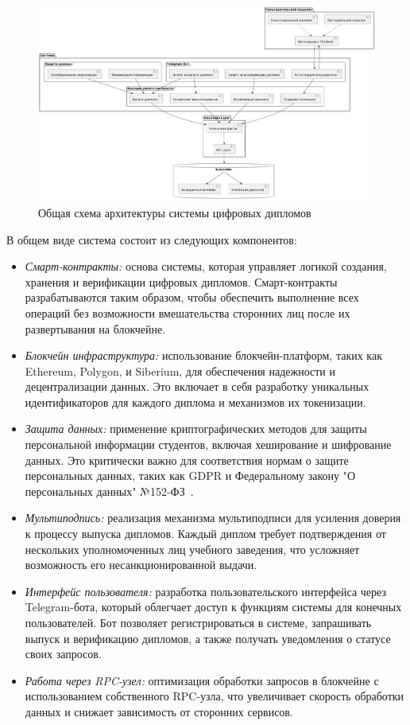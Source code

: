 \begin{figure}[H]
	\centering
	\includegraphics[width=.9\textwidth]{images/sys_arch.png}
	\parskip=6pt
	\caption{Общая схема архитектуры системы цифровых дипломов}
	\label{fig:sys_arch}
\end{figure}

В общем виде система состоит из следующих компонентов:

\begin{itemize}
    \item \textit{Смарт-контракты:} основа системы, которая управляет логикой создания, хранения и верификации цифровых дипломов. Смарт-контракты разрабатываются таким образом, чтобы обеспечить выполнение всех операций без возможности вмешательства сторонних лиц после их развертывания на блокчейне.
    \item \textit{Блокчейн инфраструктура:} использование блокчейн-платформ, таких как Ethereum, Polygon, и Siberium, для обеспечения надежности и децентрализации данных. Это включает в себя разработку уникальных идентификаторов для каждого диплома и механизмов их токенизации.
    \item \textit{Защита данных:} применение криптографических методов для защиты персональной информации студентов, включая хеширование и шифрование данных. Это критически важно для соответствия нормам о защите персональных данных, таких как GDPR и Федеральному закону "О персональных данных" №152-ФЗ~\cite{bib:152fz}.
    \item \textit{Мультиподпись:} реализация механизма мультиподписи для усиления доверия к процессу выпуска дипломов. Каждый диплом требует подтверждения от нескольких уполномоченных лиц учебного заведения, что усложняет возможность его несанкционированной выдачи.
    \item \textit{Интерфейс пользователя:} разработка пользовательского интерфейса через Telegram-бота, который облегчает доступ к функциям системы для конечных пользователей. Бот позволяет регистрироваться в системе, запрашивать выпуск и верификацию дипломов, а также получать уведомления о статусе своих запросов.
    \item \textit{Работа через RPC-узел:} оптимизация обработки запросов в блокчейне с использованием собственного RPC-узла, что увеличивает скорость обработки данных и снижает зависимость от сторонних сервисов.
\end{itemize}

